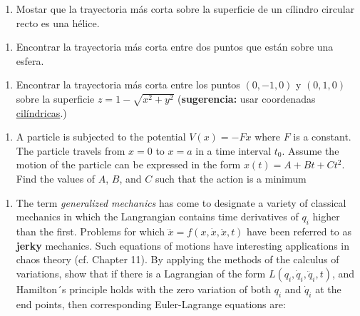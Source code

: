 \documentclass{article}
\begin{document}
\setlength{\columnsep}{2cm}
\begin{multicols}{2} %
	\begin{enumerate}[label={{\textcolor{trueblue}{\textbf{Ej}. \arabic*.0}}}, start=1]
		\item Mostar que la trayectoria más corta sobre la superficie de un cílindro circular recto es una hélice.
	\end{enumerate}
	
	
	\begin{enumerate}[label={{\textcolor{trueblue}{\textbf{Ej}. \arabic*.0}}}, start=2]
		\item Encontrar la trayectoria más corta entre dos puntos que están sobre una esfera.
	\end{enumerate}  
	
	\begin{enumerate}[label={{\textcolor{trueblue}{\textbf{Ej}. \arabic*.0}}}, start=3]
		\item Encontrar la trayectoria más corta entre los puntos $(0,-1,0)$ y $(0,1,0)$ sobre la superficie $z=1-\sqrt{x^{2}+y^{2}}$ (\textbf{sugerencia:} usar coordenadas \underline{cilíndricas}.)
	\end{enumerate} 
	
	\begin{enumerate}[label={{\textcolor{trueblue}{\textbf{Ej}. \arabic*.0}}}, start=5]
		\item A particle is subjected to the potential $V(x) = -Fx$ where $F$ is a constant. The particle travels from $x=0$ to $x=a$ in a time interval $t_{0}$. Assume the motion of the particle can be expressed in the form $x(t)=A + Bt + Ct^{2}$. Find the values of $A$, $B$, and $C$ such that the action is a minimum
	\end{enumerate} 
	
	\begin{enumerate}[label={{\textcolor{trueblue}{\textbf{Ej}. \arabic*.0}}}, start=12]
		\item The term \textit{generalized mechanics} has come to designate a variety of classical mechanics in which the Langrangian contains time derivatives of $q_{i}$ higher than the first. Problems for which $\dddot{x} = f(x,\dot{x}, \ddot{x}, t)$ have been referred to as \textbf{jerky} mechanics. Such equations of motions have interesting applications in chaos theory (cf. Chapter 11). By applying the methods of the calculus of variations, show that if there is a Lagrangian of the form $L\left( q_{i}, \dot{q}_{i}, \ddot{q}_{i}, t \right)$, and Hamilton´s principle holds with the zero variation of both $q_{i}$ and $\dot{q}_{i}$ at the end points, then corresponding Euler-Lagrange equations are:
		

\end{enumerate}
\end{multicols}
\end{document}
